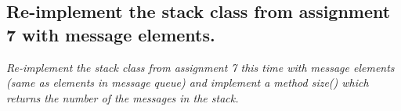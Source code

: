 \documentclass[main.tex]{subfiles}
\begin{document}
\subsection*{Re-implement the stack class from assignment 7 with message elements.}
\textit{Re-implement the stack class from assignment 7 this time with message elements (same as
elements in message queue) and implement a method size() which returns the number of the
messages in the stack.}
\end{document}

